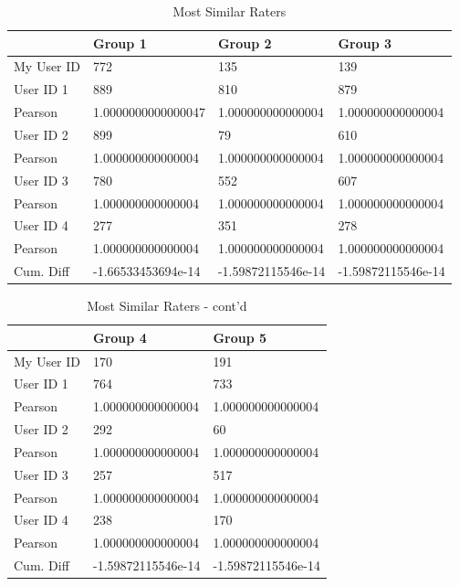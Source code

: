 \documentclass[letterpaper,11pt]{report}
\begin{document}
\begin{savenotes}
\begin{enumerate}
\begin{table*}[htbp]
\centering
\begin{tabular}{|l|l|l|l|}
\hline
    ~          & Group 1            & Group 2            & Group 3            \\ \hline
    My User ID & 772                & 135                & 139                \\ \hline
    User ID 1  & 889                & 810                & 879                \\ \hline
    Pearson    & 1.0000000000000047 & 1.000000000000004  & 1.000000000000004  \\ \hline
    User ID 2  & 899                & 79                 & 610                \\ \hline
    Pearson    & 1.000000000000004  & 1.000000000000004  & 1.000000000000004  \\ \hline
    User ID 3  & 780                & 552                & 607                \\ \hline
    Pearson    & 1.000000000000004  & 1.000000000000004  & 1.000000000000004  \\ \hline
    User ID 4  & 277                & 351                & 278                \\ \hline
    Pearson    & 1.000000000000004  & 1.000000000000004  & 1.000000000000004  \\ \hline
    Cum. Diff  & -1.66533453694e-14 & -1.59872115546e-14 & -1.59872115546e-14 \\ \hline
\end{tabular}
\caption{Most Similar Raters}
\label{tab:MostSimilar1}
\end{table*}

\begin{table*}[htbp]
\centering
\begin{tabular}{|l|l|l|}
\hline
    ~          & Group 4            & Group 5               \\ \hline
    My User ID & 170                & 191                   \\ \hline
    User ID 1  & 764                & 733                   \\ \hline
    Pearson    & 1.000000000000004  & 1.000000000000004     \\ \hline
    User ID 2  & 292                & 60                    \\ \hline
    Pearson    & 1.000000000000004  & 1.000000000000004     \\ \hline
    User ID 3  & 257                & 517                   \\ \hline
    Pearson    & 1.000000000000004  & 1.000000000000004     \\ \hline
    User ID 4  & 238                & 170                   \\ \hline
    Pearson    & 1.000000000000004  & 1.000000000000004     \\ \hline
    Cum. Diff  & -1.59872115546e-14 & -1.59872115546e-14 \\ \hline
\end{tabular}
\caption{Most Similar Raters - cont'd}
\label{tab:MostSimilar2}
\end{table*}


\end{enumerate}
\end{savenotes}
\end{document}
